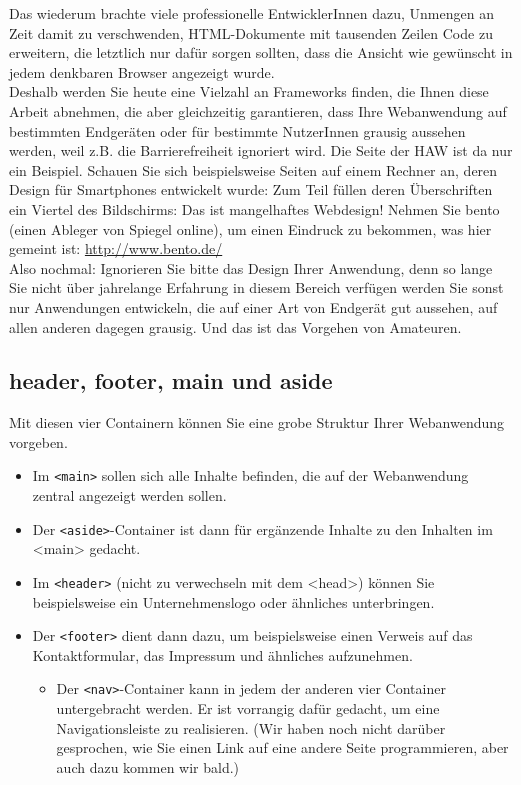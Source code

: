 Das wiederum brachte viele \glqq{}professionelle\grqq{} EntwicklerInnen dazu, Unmengen an Zeit damit zu verschwenden, HTML-Dokumente mit tausenden Zeilen Code zu erweitern, die letztlich nur dafür sorgen sollten, dass die Ansicht wie gewünscht in jedem denkbaren Browser angezeigt wurde.\\

Deshalb werden Sie heute eine Vielzahl an Frameworks finden, die Ihnen diese Arbeit abnehmen, die aber gleichzeitig garantieren, dass Ihre Webanwendung auf bestimmten Endgeräten oder für bestimmte NutzerInnen grausig aussehen werden, weil z.B. die Barrierefreiheit ignoriert wird. Die Seite der HAW ist da nur ein Beispiel. Schauen Sie sich beispielsweise Seiten auf einem Rechner an, deren Design für Smartphones entwickelt wurde: Zum Teil füllen deren Überschriften ein Viertel des Bildschirms: Das ist mangelhaftes Webdesign! Nehmen Sie bento (einen Ableger von Spiegel online), um einen Eindruck zu bekommen, was hier gemeint ist: \url{http://www.bento.de/}\\

Also nochmal: Ignorieren Sie bitte das Design Ihrer Anwendung, denn so lange Sie nicht über jahrelange Erfahrung in diesem Bereich verfügen werden Sie sonst nur Anwendungen entwickeln, die auf einer Art von Endgerät gut aussehen, auf allen anderen dagegen grausig. Und das ist das Vorgehen von Amateuren.

\subsection{header, footer, main und aside}

Mit diesen vier Containern können Sie eine grobe Struktur Ihrer Webanwendung vorgeben.

\begin{itemize}
	\item Im \verb|<main>| sollen sich alle Inhalte befinden, die auf der Webanwendung zentral angezeigt werden sollen.
	\item Der \verb|<aside>|-Container ist dann für ergänzende Inhalte zu den Inhalten im <main> gedacht.
	\item Im \verb|<header>| (nicht zu verwechseln mit dem <head>) können Sie beispielsweise ein Unternehmenslogo oder ähnliches unterbringen.
	\item Der \verb|<footer>| dient dann dazu, um beispielsweise einen Verweis auf das Kontaktformular, das Impressum und ähnliches aufzunehmen.
	\begin{itemize}
		\item Der \verb|<nav>|-Container kann in jedem der anderen vier Container untergebracht werden. Er ist vorrangig dafür gedacht, um eine Navigationsleiste zu realisieren. (Wir haben noch nicht darüber gesprochen, wie Sie einen Link auf eine andere Seite programmieren, aber auch dazu kommen wir bald.)
	\end{itemize}
\end{itemize}

